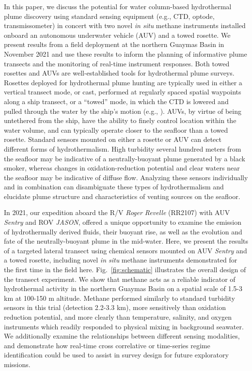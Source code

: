 In this paper, we discuss the potential for water column-based hydrothermal plume discovery using standard sensing equipment (e.g., CTD, optode, transmissometer) in concert with two novel \emph{in situ} methane instruments installed onboard an autonomous underwater vehicle (AUV) and a towed rosette. We present results from a field deployment at the northern Guaymas Basin in November 2021 and use these results to inform the planning of informative plume transects and the monitoring of real-time instrument responses. Both towed rosettes and AUVs are well-established tools for hydrothermal plume surveys. Rosettes deployed for hydrothermal plume hunting are typically used in either a vertical transect mode, or cast, performed at regularly spaced spatial waypoints along a ship transect, or a ``towed'' mode, in which the CTD is lowered and pulled through the water by the ship’s motion (e.g., \cite{chin1994situ, bennett2013trophic}). AUVs, by virtue of being untethered from the ship, have the ability to finely control location within the water volume, and can typically operate closer to the seafloor than a towed rosette. Standard sensors mounted on either a rosette or AUV can detect different forms of hydrothermalism. High turbidity several hundred meters from the seafloor may be indicative of a neutrally-buoyant plume generated by a black smoker, whereas changes in oxidation-reduction potential and clear waters near the seafloor may be indicative of diffuse flow. Analyzing these sensors individually and in combination can disambiguate these types of hydrothermalism and elucidate plume structure and characteristics of venting sources on the seafloor.

In 2021, our expedition aboard the R/V \emph{Roger Revelle} (RR2107) with AUV \emph{Sentry} and ROV \emph{JASON}, offered a unique opportunity to examine the emission of hydrothermally derived fluids, their buoyant rise, as well as the evolution and fate of the neutrally-buoyant plume in the mid-water. Here, we present the results of a targeted lateral transect using chemical sensors mounted on AUV \emph{Sentry} and a towed rosette, including novel \emph{in situ} methane instruments demonstrated for the first time in the field here. Fig.~\ref{fig:schematic} illustrates the overall design of the transect experiment. We show that methane acts as a reliable indicator of hydrothermal activity in the northern Guaymas Basin on a spatial scale of 1.5-3 km at 100-150 m altitude. Methane performed similarly to standard turbidity sensors in this trial (detection 2.2-3.3 km), more sensitively than oxidation reduction potential, and more clearly than temperature, salinity, and oxygen instruments which readily responded to physical mixing in background seawater. We additionally examine the relationships between different sensing modalities, and demonstrate how real-time cross correlative or time-series regime identification could be used to assist in survey design for future exploratory missions. 

